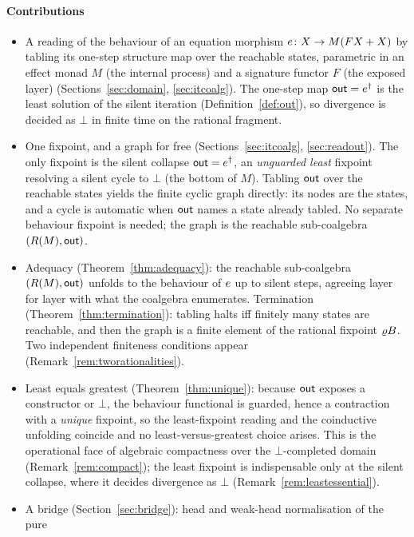 \paragraph{Contributions}
\begin{itemize}
  \item A reading of the behaviour of an equation morphism $e \colon X \to M(F X + X)$ by
    tabling its one-step structure map over the reachable states, parametric in an effect monad
    $M$ (the internal process) and a signature functor $F$ (the exposed layer)
    (Sections~\ref{sec:domain}, \ref{sec:itcoalg}). The one-step map $\mathsf{out} = e^{\dagger}$ is
    the least solution of the silent iteration (Definition~\ref{def:out}), so divergence is
    decided as $\bot$ in finite time on the rational fragment.
  \item One fixpoint, and a graph for free (Sections~\ref{sec:itcoalg}, \ref{sec:readout}). The
    only fixpoint is the silent collapse $\mathsf{out} = e^{\dagger}$, an \emph{unguarded least}
    fixpoint resolving a silent cycle to $\bot$ (the bottom of $M$). Tabling $\mathsf{out}$ over the
    reachable states yields the finite cyclic graph directly: its nodes are the states, and a
    cycle is automatic when $\mathsf{out}$ names a state already tabled. No separate behaviour fixpoint is
    needed; the graph is the reachable sub-coalgebra $(R(M),\mathsf{out})$.
  \item Adequacy (Theorem~\ref{thm:adequacy}): the reachable sub-coalgebra $(R(M),\mathsf{out})$ unfolds to
    the behaviour of $e$ up to silent steps, agreeing layer for layer with what the coalgebra
    enumerates. Termination (Theorem~\ref{thm:termination}): tabling halts iff finitely many
    states are reachable, and then the graph is a finite element of the rational fixpoint
    $\varrho B$. Two independent finiteness conditions appear (Remark~\ref{rem:tworationalities}).
  \item Least equals greatest (Theorem~\ref{thm:unique}): because $\mathsf{out}$ exposes a constructor or
    $\bot$, the behaviour functional is guarded, hence a contraction with a \emph{unique} fixpoint,
    so the least-fixpoint reading and the coinductive unfolding coincide and no least-versus-greatest
    choice arises. This is the operational face of algebraic compactness over the $\bot$-completed
    domain (Remark~\ref{rem:compact}); the least fixpoint is indispensable only at the silent
    collapse, where it decides divergence as $\bot$ (Remark~\ref{rem:leastessential}).
  \item A bridge (Section~\ref{sec:bridge}): head and weak-head normalisation of the pure

\end{itemize}
